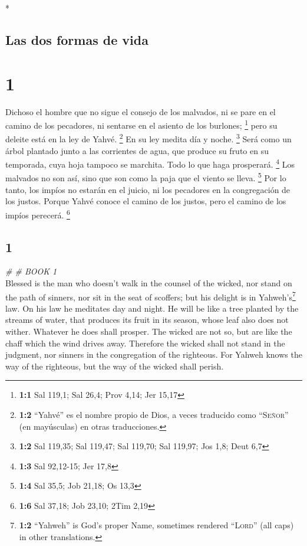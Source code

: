 \begin{paracol}{2} \switchcolumn[0]*

\hypertarget{las-dos-formas-de-vida}{%
\subsection{Las dos formas de vida}\label{las-dos-formas-de-vida}}

\hypertarget{section}{%
\section{1}\label{section}}

 Dichoso el hombre que no sigue el consejo de los
malvados, ni se pare en el camino de los pecadores, ni sentarse en el
asiento de los burlones; \footnote{\textbf{1:1} Sal 119,1; Sal 26,4;
  Prov 4,14; Jer 15,17}  pero su deleite está en la ley de
Yahvé. \footnote{\textbf{1:2} ``Yahvé'' es el nombre propio de Dios, a
  veces traducido como ``\textsc{Señor}'' (en mayúsculas) en otras
  traducciones.} En su ley medita día y noche. \footnote{\textbf{1:2}
  Sal 119,35; Sal 119,47; Sal 119,70; Sal 119,97; Jos 1,8; Deut 6,7}
 Será como un árbol plantado junto a las corrientes de
agua, que produce su fruto en su temporada, cuya hoja tampoco se
marchita. Todo lo que haga prosperará. \footnote{\textbf{1:3} Sal
  92,12-15; Jer 17,8}  Los malvados no son así, sino que
son como la paja que el viento se lleva. \footnote{\textbf{1:4} Sal
  35,5; Job 21,18; Os 13,3}  Por lo tanto, los impíos no
estarán en el juicio, ni los pecadores en la congregación de los justos.
 Porque Yahvé conoce el camino de los justos, pero el
camino de los impíos perecerá. \footnote{\textbf{1:6} Sal 37,18; Job
  23,10; 2Tim 2,19}

\switchcolumn
\begin{otherlanguage}{english}

\hypertarget{section-1}{%
\section{1}\label{section-1}}

\emph{\# \# BOOK 1}\\

 Blessed is the man who doesn't walk in the counsel of the
wicked, nor stand on the path of sinners, nor sit in the seat of
scoffers;  but his delight is in Yahweh's\footnote{\textbf{1:2}
  ``Yahweh'' is God's proper Name, sometimes rendered ``\textsc{Lord}''
  (all caps) in other translations.} law. On his law he meditates day
and night.  He will be like a tree planted by the streams
of water, that produces its fruit in its season, whose leaf also does
not wither. Whatever he does shall prosper.  The wicked
are not so, but are like the chaff which the wind drives away.
 Therefore the wicked shall not stand in the judgment, nor
sinners in the congregation of the righteous.  For Yahweh
knows the way of the righteous, but the way of the wicked shall perish.


\end{otherlanguage}
\end{paracol}
